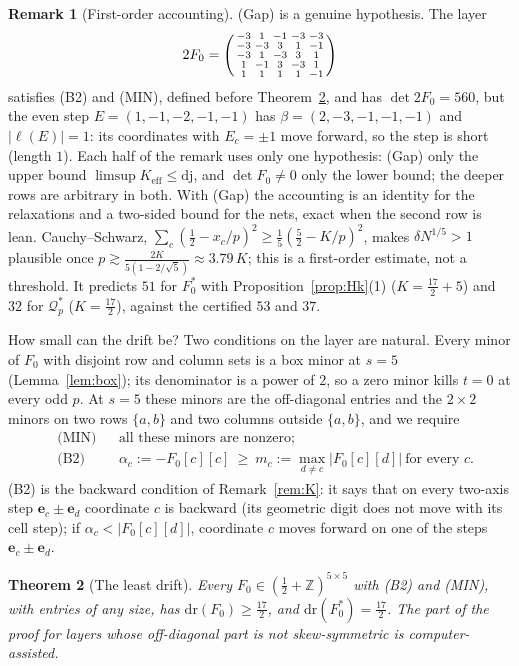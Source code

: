 \documentclass[11pt]{amsart}
\newtheorem{theorem}{Theorem}
\theoremstyle{definition}
\newtheorem{remark}[theorem]{Remark}
\theoremstyle{plain}
\newcommand{\Z}{\mathbb{Z}}
\newcommand{\e}{\mathbf{e}}
\begin{document}
\begin{remark}[First-order accounting]
(Gap) is a genuine hypothesis. The layer
\[
2F_0=\begin{psmallmatrix}-3&1&-1&-3&-3\\-3&-3&3&1&-1\\-3&1&-3&3&1\\1&-1&3&-3&1\\1&1&1&1&-1\end{psmallmatrix}
\]
satisfies (B2) and (MIN), defined before Theorem~\ref{thm:D}, and has $\det2F_0=560$, but the even step $E=(1,-1,-2,-1,-1)$ has $\beta=(2,-3,-1,-1,-1)$ and $|\ell(E)|=1$: its coordinates with $E_c=\pm1$ move forward, so the step is short (length $1$). Each half of the remark uses only one hypothesis: (Gap) only the upper bound $\limsup K_{\mathrm{eff}}\le\mathrm{dj}$, and $\det F_0\ne0$ only the lower bound; the deeper rows are arbitrary in both. With (Gap) the accounting is an identity for the relaxations and a two-sided bound for the nets, exact when the second row is lean. Cauchy--Schwarz, $\sum_c(\frac12-x_c/p)^2\ge\frac15(\frac52-K/p)^2$, makes $\delta N^{1/5}>1$ plausible once $p\gtrsim\frac{2K}{5(1-2/\sqrt5)}\approx3.79\,K$; this is a first-order estimate, not a threshold. It predicts $51$ for $F_0^*$ with Proposition~\ref{prop:Hk}(1) ($K=\frac{17}2+5$) and $32$ for $\mathcal Q^*_p$ ($K=\frac{17}2$), against the certified $53$ and $37$.
\end{remark}

How small can the drift be? Two conditions on the layer are natural. Every minor of $F_0$ with disjoint row and column sets is a box minor at $s=5$ (Lemma~\ref{lem:box}); its denominator is a power of $2$, so a zero minor kills $t=0$ at every odd $p$. At $s=5$ these minors are the off-diagonal entries and the $2\times2$ minors on two rows $\{a,b\}$ and two columns outside $\{a,b\}$, and we require
\begin{align*}
&\text{(MIN)}&&\text{all these minors are nonzero;}\\
&\text{(B2)}&&\alpha_c:=-F_0[c][c]\ \ge\ m_c:=\max_{d\ne c}|F_0[c][d]|\ \text{for every }c.
\end{align*}
(B2) is the backward condition of Remark~\ref{rem:K}: it says that on every two-axis step $\e_c\pm\e_d$ coordinate $c$ is backward (its geometric digit does not move with its cell step); if $\alpha_c<|F_0[c][d]|$, coordinate $c$ moves forward on one of the steps $\e_c\pm\e_d$.

\begin{theorem}[The least drift]\label{thm:D}
Every $F_0\in(\frac12+\Z)^{5\times5}$ with (B2) and (MIN), with entries of any size, has $\mathrm{dr}(F_0)\ge\frac{17}2$, and $\mathrm{dr}(F_0^*)=\frac{17}2$. The part of the proof for layers whose off-diagonal part is not skew-symmetric is computer-assisted.
\end{theorem}
\end{document}
